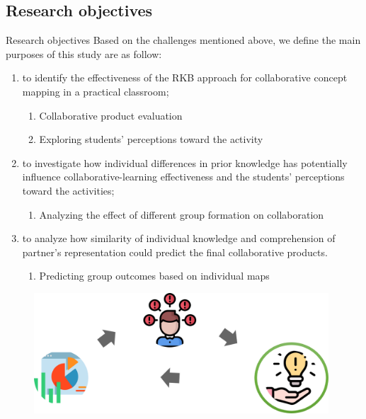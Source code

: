 \subsection{Research objectives}
\begin{frame}{Research objectives}
    Based on the challenges mentioned above, we define the main purposes of this study are as follow: 
    \begin{enumerate}[A]
        \item <1-> {to identify the effectiveness of the RKB approach for collaborative concept mapping in a practical classroom};
        \begin{enumerate}
            \item <2-> Collaborative product evaluation
            \item <2-> Exploring students' perceptions toward the activity
        \end{enumerate}
        
        \item <3-> { to investigate how individual differences in prior knowledge has potentially influence collaborative-learning effectiveness and the students' perceptions toward the activities}; 
        \begin{enumerate}[3]
            \item <4-> Analyzing the effect of different group formation on collaboration
        \end{enumerate}
        
        \item <5-> { to analyze how similarity of individual knowledge and comprehension  of partner's representation could predict the final collaborative products}.
        \begin{enumerate}[4]
            \item <6->Predicting group outcomes based on individual maps
        \end{enumerate}
    \end{enumerate} 
\end{frame}

\begin{frame}{}
    \begin{figure}[tb]
    \begin{center}
        \includegraphics[width=110mm]{images/intro_method.png}
    \end{center}
\end{figure}
\end{frame}

